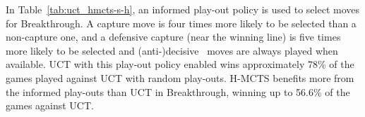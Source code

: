\documentclass[a4paper]{llncs}
\begin{document}
\begin{table}[t]
\centering
\tabcolsep=0.3cm
\vspace{2mm}
{\caption{H-MCTS vs. UCT with heuristic play-outs, with/without solver, 1,000 games} \label{tab:uct_hmcts-s-h}}
\end{table}

In Table~\ref{tab:uct_hmcts-s-h}, an informed play-out policy is used to select moves for Breakthrough. A capture move is four times more likely to be selected than a non-capture one, and a defensive capture (near the winning line) is five times more likely to be selected and (anti-)decisive~\cite{teytaud2010huge} moves are always played when available. UCT with this play-out policy enabled wins approximately 78\% of the games played against UCT with random play-outs. H-MCTS benefits more from the informed play-outs than UCT in Breakthrough, winning up to 56.6\% of the games against UCT.
\end{document}
